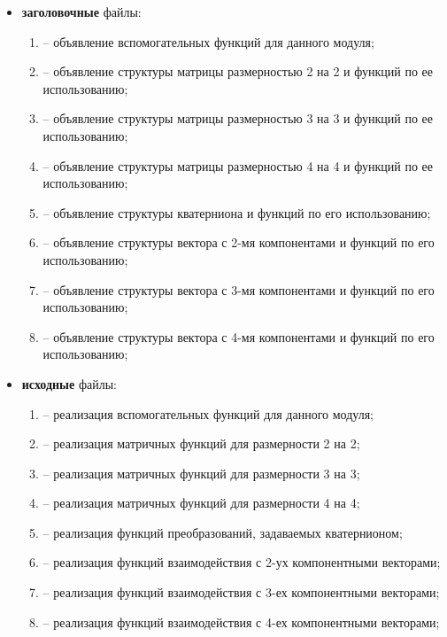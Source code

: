 \begin{itemize}[label=---]
    \item \textbf{заголовочные} файлы:
    \begin{enumerate}[label=\arabic*), labelsep=0.5em]
        \item {} -- объявление вспомогательных функций для данного модуля;
        \item {} -- объявление структуры матрицы размерностью 2 на 2 и функций по ее использованию;
        \item {} -- объявление структуры матрицы размерностью 3 на 3 и функций по ее использованию;
        \item {} -- объявление структуры матрицы размерностью 4 на 4 и функций по ее использованию;
        \item {} -- объявление структуры кватерниона и функций по его использованию;
        \item {} -- объявление структуры вектора с 2-мя компонентами и функций по его использованию;
        \item {} -- объявление структуры вектора с 3-мя компонентами и функций по его использованию;
        \item {} -- объявление структуры вектора с 4-мя компонентами и функций по его использованию;
    \end{enumerate}
    \item \textbf{исходные} файлы:
    \begin{enumerate}[label=\arabic*), labelsep=0.5em]
        \item {} -- реализация вспомогательных функций для данного модуля;
        \item {} -- реализация матричных функций для размерности 2 на 2;
        \item {} -- реализация матричных функций для размерности 3 на 3;
        \item {} -- реализация матричных функций для размерности 4 на 4;
        \item {} -- реализация функций преобразований, задаваемых кватернионом;
        \item {} --  реализация функций взаимодействия с 2-ух компонентными векторами;
        \item {} --  реализация функций взаимодействия с 3-ех компонентными векторами;
        \item {} --  реализация функций взаимодействия с 4-ех компонентными векторами;
    \end{enumerate}
\end{itemize}

